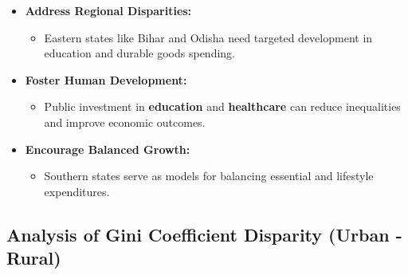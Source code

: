 \documentclass{article}
\begin{document}
\begin{itemize}
	\item \textbf{Address Regional Disparities:}
	\begin{itemize}
		\item Eastern states like Bihar and Odisha need targeted development in education and durable goods spending.
	\end{itemize}
	\item \textbf{Foster Human Development:}
	\begin{itemize}
		\item Public investment in \textbf{education} and \textbf{healthcare} can reduce inequalities and improve economic outcomes.
	\end{itemize}
	\item \textbf{Encourage Balanced Growth:}
	\begin{itemize}
		\item Southern states serve as models for balancing essential and lifestyle expenditures.
	\end{itemize}
\end{itemize}




	
	\subsection{ Analysis of Gini Coefficient Disparity (Urban - Rural)}
	
\end{document}
